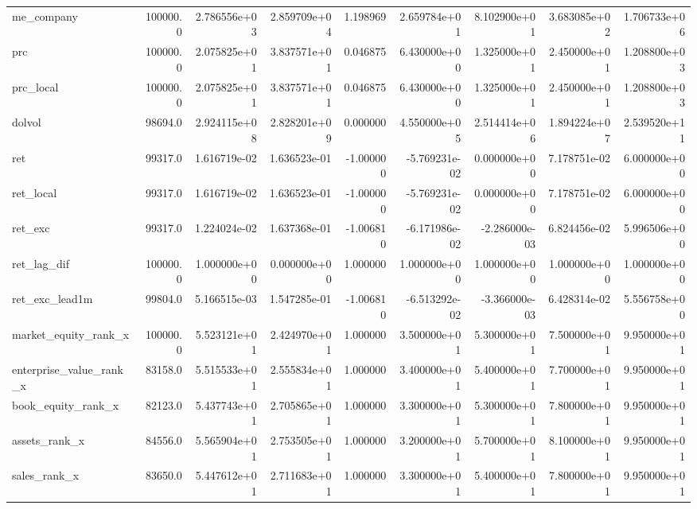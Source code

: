 \documentclass[10pt]{article}
\begin{document}
\begin{landscape}
\begin{longtable}{lrrrrrrrr}
me\_company              &  100000.0 &  2.786556e+03 &  2.859709e+04 &      1.198969 &  2.659784e+01 &  8.102900e+01 &  3.683085e+02 &  1.706733e+06 \\
prc                     &  100000.0 &  2.075825e+01 &  3.837571e+01 &      0.046875 &  6.430000e+00 &  1.325000e+01 &  2.450000e+01 &  1.208800e+03 \\
prc\_local               &  100000.0 &  2.075825e+01 &  3.837571e+01 &      0.046875 &  6.430000e+00 &  1.325000e+01 &  2.450000e+01 &  1.208800e+03 \\
dolvol                  &   98694.0 &  2.924115e+08 &  2.828201e+09 &      0.000000 &  4.550000e+05 &  2.514414e+06 &  1.894224e+07 &  2.539520e+11 \\
ret                     &   99317.0 &  1.616719e-02 &  1.636523e-01 &     -1.000000 & -5.769231e-02 &  0.000000e+00 &  7.178751e-02 &  6.000000e+00 \\
ret\_local               &   99317.0 &  1.616719e-02 &  1.636523e-01 &     -1.000000 & -5.769231e-02 &  0.000000e+00 &  7.178751e-02 &  6.000000e+00 \\
ret\_exc                 &   99317.0 &  1.224024e-02 &  1.637368e-01 &     -1.006810 & -6.171986e-02 & -2.286000e-03 &  6.824456e-02 &  5.996506e+00 \\
ret\_lag\_dif             &  100000.0 &  1.000000e+00 &  0.000000e+00 &      1.000000 &  1.000000e+00 &  1.000000e+00 &  1.000000e+00 &  1.000000e+00 \\
ret\_exc\_lead1m          &   99804.0 &  5.166515e-03 &  1.547285e-01 &     -1.006810 & -6.513292e-02 & -3.366000e-03 &  6.428314e-02 &  5.556758e+00 \\
market\_equity\_rank\_x    &  100000.0 &  5.523121e+01 &  2.424970e+01 &      1.000000 &  3.500000e+01 &  5.300000e+01 &  7.500000e+01 &  9.950000e+01 \\
enterprise\_value\_rank\_x &   83158.0 &  5.515533e+01 &  2.555834e+01 &      1.000000 &  3.400000e+01 &  5.400000e+01 &  7.700000e+01 &  9.950000e+01 \\
book\_equity\_rank\_x      &   82123.0 &  5.437743e+01 &  2.705865e+01 &      1.000000 &  3.300000e+01 &  5.300000e+01 &  7.800000e+01 &  9.950000e+01 \\
assets\_rank\_x           &   84556.0 &  5.565904e+01 &  2.753505e+01 &      1.000000 &  3.200000e+01 &  5.700000e+01 &  8.100000e+01 &  9.950000e+01 \\
sales\_rank\_x            &   83650.0 &  5.447612e+01 &  2.711683e+01 &      1.000000 &  3.300000e+01 &  5.400000e+01 &  7.800000e+01 &  9.950000e+01 \\

\end{longtable}
\end{landscape}
\end{document}
